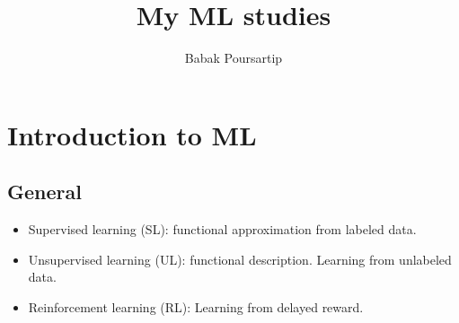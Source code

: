 \documentclass[12pt]{report}
\author{Babak Poursartip}
\title{My ML studies}
\begin{document}
\justifying


\maketitle



\tableofcontents                  %

%
\chapter[Introduction]{Introduction to ML}
\label{ch:ML}
\noindent

\section{General}

\begin{itemize}
	\item Supervised learning (SL): functional approximation from labeled data.
	\item Unsupervised learning (UL): functional description. Learning from unlabeled data.
	\item Reinforcement learning (RL): Learning from delayed reward.
\end{itemize}






\end{document}
